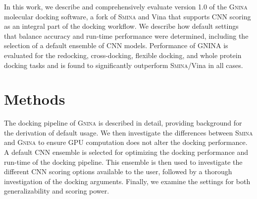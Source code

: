 \documentclass[journal=jcisd8,manuscript=article]{achemso}
\begin{document}
In this work, we describe and comprehensively evaluate version 1.0 of the \textsc{Gnina} molecular docking software, a fork of \textsc{Smina}\cite{koes2013lessons} and Vina\cite{trott2010autodock} that supports CNN scoring as an integral part of the docking workflow. We describe how default settings that balance accuracy and run-time performance were determined, including the selection of a default ensemble of CNN models. Performance of \textsc{GNINA} is evaluated for the redocking, cross-docking, flexible docking, and whole protein docking tasks and is found to significantly outperform \textsc{Smina}/Vina in all cases.



\section{Methods}

The docking pipeline of \textsc{Gnina} is described in detail, providing background for the derivation of default usage. We then investigate the differences between \textsc{Smina} and \textsc{Gnina} to ensure GPU computation does not alter the docking performance. A default CNN ensemble is selected for optimizing the docking performance and run-time of the docking pipeline. This ensemble is then used to investigate the different CNN scoring options available to the user, followed by a thorough investigation of the docking arguments. Finally, we examine the settings for both generalizability and scoring power.
\end{document}
